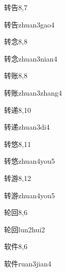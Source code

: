 \begin{entry}{转告}{8,7}
  \begin{phonetics}{转告}{zhuan3gao4}
  \end{phonetics}
\end{entry}

\begin{entry}{转念}{8,8}
  \begin{phonetics}{转念}{zhuan3nian4}
  \end{phonetics}
\end{entry}

\begin{entry}{转账}{8,8}
  \begin{phonetics}{转账}{zhuan3zhang4}
  \end{phonetics}
\end{entry}

\begin{entry}{转递}{8,10}
  \begin{phonetics}{转递}{zhuan3di4}
  \end{phonetics}
\end{entry}

\begin{entry}{转悠}{8,11}
  \begin{phonetics}{转悠}{zhuan4you5}
  \end{phonetics}
\end{entry}

\begin{entry}{转游}{8,12}
  \begin{phonetics}{转游}{zhuan4you5}
  \end{phonetics}
\end{entry}

\begin{entry}{轮回}{8,6}
  \begin{phonetics}{轮回}{lun2hui2}
  \end{phonetics}
\end{entry}

\begin{entry}{软件}{8,6}
  \begin{phonetics}{软件}{ruan3jian4}
  \end{phonetics}
\end{entry}

